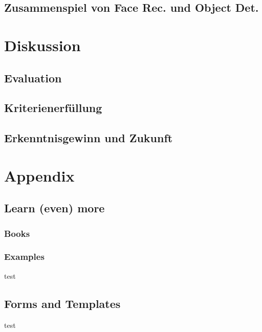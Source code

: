 \documentclass[12pt,ngerman,a4paper,oneside,,tablecaptionabove]{scrbook}
\begin{document}
\hypertarget{sec:FRuOD}{%
\section{Zusammenspiel von Face Rec. und Object Det.}\label{sec:FRuOD}}

\hypertarget{sec:Diskussion}{%
\chapter{Diskussion}\label{sec:Diskussion}}

\hypertarget{sec:Evaluation}{%
\section{Evaluation}\label{sec:Evaluation}}

\hypertarget{sec:Kriterienerfuellung}{%
\section{Kriterienerfüllung}\label{sec:Kriterienerfuellung}}

\hypertarget{sec:Zukunft}{%
\section{Erkenntnisgewinn und Zukunft}\label{sec:Zukunft}}

\hypertarget{appendix}{%
\chapter{Appendix}\label{appendix}}

\hypertarget{learn-even-more}{%
\section{Learn (even) more}\label{learn-even-more}}

\hypertarget{books}{%
\subsection{Books}\label{books}}

\hypertarget{examples}{%
\subsection{Examples}\label{examples}}

test

\hypertarget{forms-and-templates}{%
\section{Forms and Templates}\label{forms-and-templates}}

test
\end{document}
